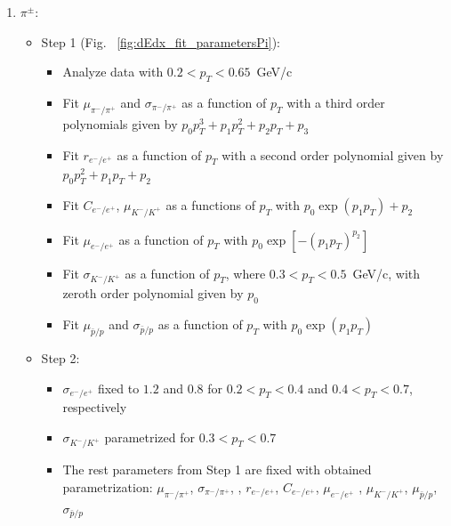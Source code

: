 \begin{enumerate}
	\item  $\pi^{\pm}$:
		\begin{itemize}
			\item Step 1 (Fig. ~\ref{fig:dEdx_fit_parametersPi}):
			\begin{itemize}
				\renewcommand\labelitemi{--}
				\item Analyze data with $0.2 < p_T < 0.65$~GeV/c
				\item Fit  $\mu_{\pi^-/\pi^+}$ and $\sigma_{\pi^-/\pi^+}$ as a function of $p_T$ with a third order polynomials given by $p_0p_T^3+p_1p_T^2+p_2p_T+p_3$
				\item Fit $r_{e^-/e^+}$ as a function of $p_T$ with a second order polynomial given by $p_0p_T^2+p_1p_T+p_2$
				\item Fit  $C_{e^-/e^+}$, $\mu_{K^-/K^+}$ as a functions of $p_T$ with $p_0\exp\left(p_1p_T\right)+p_2$
				\item Fit  $\mu_{e^-/e^+}$ as a function of $p_T$ with $p_0\exp\left[-\left(p_1p_T\right)^{p_2}\right]$ 
				\item Fit $\sigma_{K^-/K^+}$ as a function of $p_T$, where $0.3<p_T<0.5$~GeV/c, with zeroth order polynomial given by $p_0$ 
				\item Fit  $\mu_{\bar{p}/p}$ and $\sigma_{\bar{p}/p}$ as a function of $p_T$ with $p_0\exp\left(p_1p_T\right)$
			\end{itemize}
			\item Step 2:
				\begin{itemize}
					\renewcommand\labelitemi{--}
					\item $\sigma_{e^-/e^+}$ fixed to $1.2$ and $0.8$ for $0.2<p_T<0.4$ and $0.4<p_T<0.7$, respectively
					\item $\sigma_{K^-/K^+}$ parametrized for $0.3<p_T<0.7$
					\item  The rest parameters from Step 1 are fixed with obtained parametrization: $\mu_{\pi^-/\pi^+}$, $\sigma_{\pi^-/\pi^+}$, , $r_{e^-/e^+}$, $C_{e^-/e^+}$, $\mu_{e^-/e^+}$ , $\mu_{K^-/K^+}$, $\mu_{\bar{p}/p}$, $\sigma_{\bar{p}/p}$
				\end{itemize}	
		\end{itemize}		
\end{enumerate} 

